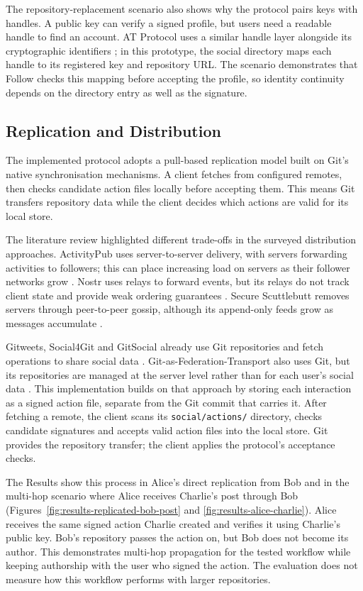 The repository-replacement scenario also shows why the protocol pairs keys
with handles. A public key can verify a signed profile, but users need a
readable handle to find an account. AT Protocol uses a similar handle layer
alongside its cryptographic identifiers \cite{atproto2026}; in this
prototype, the social directory maps each handle to its registered key and
repository URL. The scenario demonstrates that Follow checks this mapping
before accepting the profile, so identity continuity depends on the
directory entry as well as the signature.

\subsection{Replication and Distribution}

The implemented protocol adopts a pull-based replication model built on
Git's native synchronisation mechanisms. A client fetches from configured
remotes, then checks candidate action files locally before accepting them.
This means Git transfers repository data while the client decides which
actions are valid for its local store.

The literature review highlighted different trade-offs in the surveyed
distribution approaches. ActivityPub uses server-to-server delivery, with
servers forwarding activities to followers; this can place increasing load
on servers as their follower networks grow \cite{w3cActivityPub2018}. Nostr
uses relays to forward events, but its relays do not track client state and
provide weak ordering guarantees \cite{fiatjaf2026,stackernews2026}. Secure
Scuttlebutt removes servers through peer-to-peer gossip, although its
append-only feeds grow as messages accumulate
\cite{ssbConsortium2026}.

Gitweets, Social4Git and GitSocial already use Git repositories and fetch
operations to share social data \cite{gitweets2026,social4git2026,gitsocial2026}.
Git-as-Federation-Transport also uses Git, but its repositories are managed
at the server level rather than for each user's social data
\cite{gittransport2026}.
This implementation builds on that approach by storing each interaction as
a signed action file, separate from the Git commit that carries it. After
fetching a remote, the client scans its \texttt{social/actions/} directory,
checks candidate signatures and accepts valid action files into the local
store. Git provides the repository transfer; the client applies the
protocol's acceptance checks.

The Results show this process in Alice's direct replication from Bob and
in the multi-hop scenario where Alice receives Charlie's post through Bob
(Figures~\ref{fig:results-replicated-bob-post} and
\ref{fig:results-alice-charlie}). Alice receives the same signed action
Charlie created and verifies it using Charlie's public key. Bob's repository
passes the action on, but Bob does not become its author. This demonstrates
multi-hop propagation for the tested workflow while keeping authorship with
the user who signed the action. The evaluation does not measure how this
workflow performs with larger repositories.

